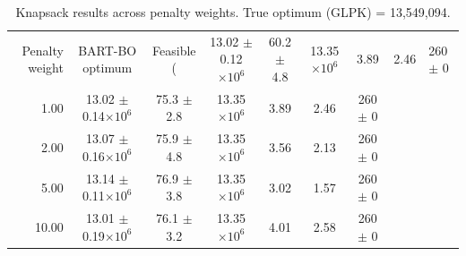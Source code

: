 \begin{table}[bt]
\centering
\caption{Knapsack results across penalty weights. True optimum (GLPK) = 13,549,094.} 
\label{tab:knapsack_results}
\begin{tabular}{rcccccc}
  \toprule
Penalty weight & BART-BO optimum & Feasible (%
   & 13.02 $\pm$ 0.12$\times 10^6$ & 60.2 $\pm$ 4.8 & 13.35$\times 10^6$ & 3.89 & 2.46 & 260 $\pm$ 0 \\ 
  1.00 & 13.02 $\pm$ 0.14$\times 10^6$ & 75.3 $\pm$ 2.8 & 13.35$\times 10^6$ & 3.89 & 2.46 & 260 $\pm$ 0 \\ 
  2.00 & 13.07 $\pm$ 0.16$\times 10^6$ & 75.9 $\pm$ 4.8 & 13.35$\times 10^6$ & 3.56 & 2.13 & 260 $\pm$ 0 \\ 
  5.00 & 13.14 $\pm$ 0.11$\times 10^6$ & 76.9 $\pm$ 3.8 & 13.35$\times 10^6$ & 3.02 & 1.57 & 260 $\pm$ 0 \\ 
  10.00 & 13.01 $\pm$ 0.19$\times 10^6$ & 76.1 $\pm$ 3.2 & 13.35$\times 10^6$ & 4.01 & 2.58 & 260 $\pm$ 0 \\ 
   \bottomrule
\end{tabular}
\end{table}
